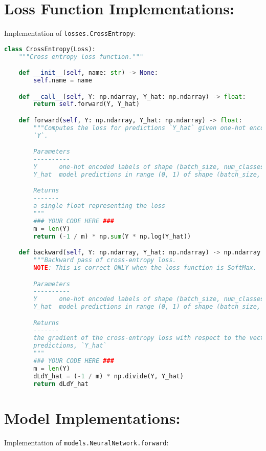 \section{Loss Function Implementations:}

Implementation of \texttt{losses.CrossEntropy}:

\begin{lstlisting}[language=Python]
class CrossEntropy(Loss):
    """Cross entropy loss function."""

    def __init__(self, name: str) -> None:
        self.name = name

    def __call__(self, Y: np.ndarray, Y_hat: np.ndarray) -> float:
        return self.forward(Y, Y_hat)

    def forward(self, Y: np.ndarray, Y_hat: np.ndarray) -> float:
        """Computes the loss for predictions `Y_hat` given one-hot encoded labels
        `Y`.

        Parameters
        ----------
        Y      one-hot encoded labels of shape (batch_size, num_classes)
        Y_hat  model predictions in range (0, 1) of shape (batch_size, num_classes)

        Returns
        -------
        a single float representing the loss
        """
        ### YOUR CODE HERE ###
        m = len(Y)
        return (-1 / m) * np.sum(Y * np.log(Y_hat))

    def backward(self, Y: np.ndarray, Y_hat: np.ndarray) -> np.ndarray:
        """Backward pass of cross-entropy loss.
        NOTE: This is correct ONLY when the loss function is SoftMax.

        Parameters
        ----------
        Y      one-hot encoded labels of shape (batch_size, num_classes)
        Y_hat  model predictions in range (0, 1) of shape (batch_size, num_classes)

        Returns
        -------
        the gradient of the cross-entropy loss with respect to the vector of
        predictions, `Y_hat`
        """
        ### YOUR CODE HERE ###
        m = len(Y)
        dLdY_hat = (-1 / m) * np.divide(Y, Y_hat)
        return dLdY_hat

\end{lstlisting}


\section{Model Implementations:}

Implementation of \texttt{models.NeuralNetwork.forward}:

